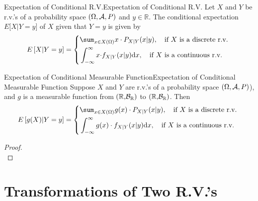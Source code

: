 \documentclass{elegantbook}
\begin{document}
\begin{definition}{Expectation of Conditional R.V.}{Expectation of Conditional R.V.}
Let \(X\) and \(Y\) be r.v.'s of a probability space $(\Omega,\mathcal{A}, P)$ and
\(y \in \mathbb{R}\). The conditional expectation \(E\lbrack X|Y = y\rbrack\) of \(X\) given that \(Y = y\) is given by
\[E\left\lbrack X | Y = y \right\rbrack = \left\{ \begin{aligned}
&\sum_{x \in X(\Omega)}^{}{x \cdot P_{X|Y}(x|y),\quad \mathrm{\text{if\ }}X\mathrm{\text{\ is\ a\ discrete\ r.v.}}} \\
&\int_{- \infty}^{\infty}{x \cdot}f_{X|Y}(x|y)\dif x,\quad\mathrm{\text{if\ }}X\mathrm{\text{\ is\ a\ continuous\ r.v.}} \\
\end{aligned} \right.\ \]
\end{definition}

\begin{theorem}{Expectation of Conditional Measurable Function}{Expectation of Conditional Measurable Function}
Suppose \(X\) and \(Y\) are r.v.'s of a probability space $(\Omega,\mathcal{A}, P)$), and \(g\) is a measurable function from \(\mathbb{(R,}\mathcal{B}_{\mathbb{R}})\) to \(\mathbb{(R,}\mathcal{B}_{\mathbb{R}})\). Then
\[E\left\lbrack g(X) | Y = y \right\rbrack = \left\{ \begin{aligned}
&\sum_{x \in X(\Omega)}^{}{g(x) \cdot P_{X|Y}(x|y),\quad \mathrm{\text{if\ }}X\mathrm{\text{\ is\ a\ discrete\ r.v.}}} \\
&\int_{- \infty}^{\infty}g(x) \cdot f_{X|Y}(x|y)\dif x,\quad\mathrm{\text{if\ }}X\mathrm{\text{\ is\ a\ continuous\ r.v.}} \\
\end{aligned} \right.\ \]
\end{theorem}

\begin{proof}
\\[4cm]\vspace{0.01cm}
\end{proof}

\section{Transformations of Two R.V.'s}
\end{document}
